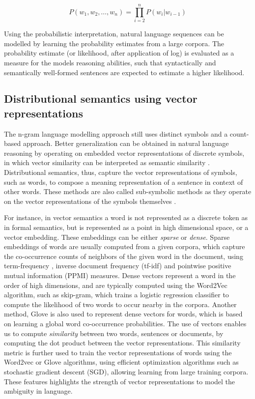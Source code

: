 \documentclass[letterpaper, 12pt]{report}
\begin{document}
\begin{equation}
  P(w_{1}, w_{2}, \ldots, w_{n}) = \prod_{i=2}^{n}P(w_{i}|w_{i-1})
\end{equation}

Using the probabilistic interpretation, natural language sequences can be modelled by learning the probability estimates from a large corpora. The probability estimate (or likelihood, after application of log) is evaluated as a measure for the models reasoning abilities, such that syntactically and semantically well-formed sentences are expected to estimate a higher likelihood.

\subsection{Distributional semantics using vector representations}
\label{sec:bg_distributional_semantics}

The n-gram language modelling approach still uses distinct symbols and a count-based approach.
Better generalization can be obtained in natural language reasoning by operating on embedded vector representations of discrete symbols, in which vector similarity can be interpreted as semantic similarity \citep{joos1950description,harris-1954-distributional,firth1957synopsis}. Distributional semantics, thus, capture the vector representations of symbols, such as words, to compose a meaning representation of a sentence in context of other words. These methods are also called sub-symbolic methods as they operate on the vector representations of the symbols themselves \citep{neelakantan2015compositional}.

For instance, in vector semantics a word is not represented as a discrete token as in formal semantics, but is represented as a point in high dimensional space, or a vector embedding. These embeddings can be either \textit{sparse} or \textit{dense}. Sparse embeddings of words are usually computed from a given corpora, which capture the co-occurrence counts of neighbors of the given word in the document, using term-frequency \citep{luhn1957statistical}, inverse document frequency \citep{jones1972statistical} (tf-idf) and pointwise positive mutual information (PPMI) \citep{fano1949transmission} measures. Dense vectors represent a word in the order of high dimensions, and are typically computed using the Word2Vec algorithm, such as skip-gram, which trains a logistic regression classifier to compute the likelihood of two words to occur nearby in the corpora. Another method, Glove \citep{pennington2014glove} is also used to represent dense vectors for words, which is based on learning a global word co-occurrence probabilities. The use of vectors enables us to compute \textit{similarity} between two words, sentences or documents, by computing the dot product between the vector representations. This similarity metric is further used to train the vector representations of words using the Word2vec \citep{mikolov2013efficient} or Glove \citep{pennington2014glove} algorithms, using efficient optimization algorithms such as stochastic gradient descent (SGD), allowing learning from large training corpora. These features highlights the strength of vector representations to model the ambiguity in language.
\end{document}
